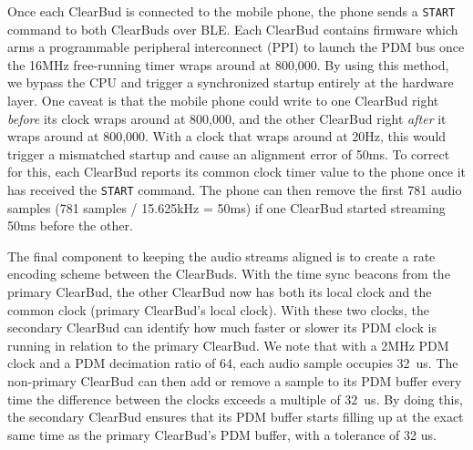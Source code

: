 \documentclass [11pt, proquest] {uwthesis}[2020/02/24]
\begin{document}
Once each ClearBud is connected to the mobile phone, the phone sends a \verb|START| command to both ClearBuds over BLE. Each ClearBud contains firmware which arms a programmable peripheral interconnect (PPI) to launch the PDM bus once the 16MHz free-running timer wraps around at 800,000. By using this method, we bypass the CPU and trigger a synchronized startup entirely at the hardware layer. One caveat is that the mobile phone could write to one ClearBud right \textit{before} its clock wraps around at 800,000, and the other ClearBud right \textit{after} it wraps around at 800,000. With a clock that wraps around at 20Hz, this would trigger a mismatched startup and cause an alignment error of 50ms. To correct for this, each ClearBud reports its common clock timer value to the phone once it has received the \verb|START| command. The phone can then remove the first 781 audio samples (781 samples / 15.625kHz = 50ms) if one ClearBud started streaming 50ms before the other.

The final component to keeping the audio streams aligned is to create a rate encoding scheme between the ClearBuds. With the time sync beacons from the primary ClearBud, the other ClearBud now has both its local clock and the common clock (primary ClearBud's local clock). With these two clocks, the secondary ClearBud can identify how much faster or slower its PDM clock is running in relation to the primary ClearBud. We note that with a 2MHz PDM clock and a PDM decimation ratio of 64, each audio sample occupies 32~us. The non-primary ClearBud can then add or remove a sample to its PDM buffer every time the difference between the clocks exceeds a multiple of 32~us. By doing this, the secondary ClearBud ensures that its PDM buffer starts filling up at the exact same time as the primary ClearBud's PDM buffer, with a tolerance of 32 us. 
\end{document}
